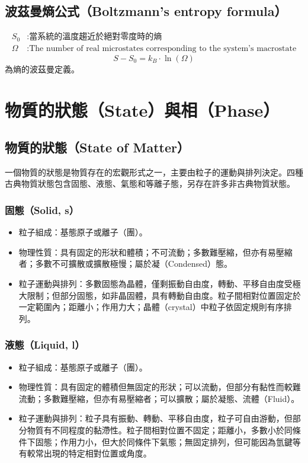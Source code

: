 \documentclass[a4paper,12pt]{report}
\begin{document}
\subsection{波茲曼熵公式（Boltzmann's entropy formula）}
\[\begin{aligned}
S_0&: \text{當系統的溫度趨近於絕對零度時的熵}\\
\Omega&: \text{The number of real microstates corresponding to the system's macrostate}
\end{aligned}\]
\[S-S_0 = k_B \cdot \ln(\Omega)\]
為熵的波茲曼定義。


\section{物質的狀態（State）與相（Phase）}
\subsection{物質的狀態（State of Matter）}
一個物質的狀態是物質存在的宏觀形式之一，主要由粒子的運動與排列決定。四種古典物質狀態包含固態、液態、氣態和等離子態，另存在許多非古典物質狀態。
\subsubsection{固態（Solid, s）}
\begin{itemize}
\item 粒子組成：基態原子或離子（團）。
\item 物理性質：具有固定的形狀和體積；不可流動；多數難壓縮，但亦有易壓縮者；多數不可擴散或擴散極慢；屬於凝（Condensed）態。
\item 粒子運動與排列：多數固態為晶體，僅剩振動自由度，轉動、平移自由度受極大限制；但部分固態，如非晶固體，具有轉動自由度。粒子間相對位置固定於一定範圍內；距離小；作用力大；晶體（crystal）中粒子依固定規則有序排列。
\end{itemize}
\subsubsection{液態（Liquid, l）}
\begin{itemize}
\item 粒子組成：基態原子或離子（團）。
\item 物理性質：具有固定的體積但無固定的形狀；可以流動，但部分有黏性而較難流動；多數難壓縮，但亦有易壓縮者；可以擴散；屬於凝態、流體（Fluid）。
\item 粒子運動與排列：粒子具有振動、轉動、平移自由度，粒子可自由游動，但部分物質有不同程度的黏滯性。粒子間相對位置不固定；距離小，多數小於同條件下固態；作用力小，但大於同條件下氣態；無固定排列，但可能因為氫鍵等有較常出現的特定相對位置或角度。
\end{itemize}
\end{document}
